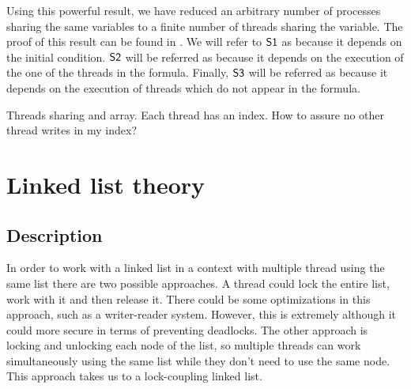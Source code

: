Using this powerful result, we have reduced an arbitrary number of processes sharing the same variables to a finite number of threads sharing the variable. 
%
The proof of this result can be found in .
%
We will refer to $\mathsf{S1}$ as  because it depends on the initial condition.
%
$\mathsf{S2}$ will be referred as  because it depends on the execution of the one of the threads in the formula.
%
Finally, $\mathsf{S3}$ will be referred as  because it depends on the execution of threads which do not appear in the formula. 


\begin{example}
Threads sharing and array. Each thread has an index. How to assure no other thread writes in my index?
\end{example}


\section{Linked list theory}

\subsection{Description}

In order to work with a linked list in a context with multiple thread using the same list 
there are two possible approaches. 
%
A thread could lock the entire list, work with it and then release it. 
%
There could be some optimizations in this approach, such as a writer-reader system.
%
However, this is extremely  although it could more secure in terms of preventing deadlocks.
%
The other approach is locking and unlocking each node of the list, so multiple threads can work simultaneously using the same list while they don't need to use the same node.
%
This approach takes us to a lock-coupling linked list.



